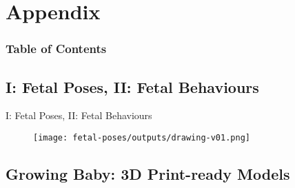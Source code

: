 \section{Appendix}

\begin{frame}
  \frametitle{Table of Contents}
  \tableofcontents[currentsection]
\end{frame}


\subsection{I: Fetal Poses, II: Fetal Behaviours}

{
\begin{frame}{I: Fetal Poses, II: Fetal Behaviours}
      \begin{figure}
        \centering
        \texttt{[image: fetal-poses/outputs/drawing-v01.png]}
      \end{figure}
\end{frame}
}

\subsection{Growing Baby: 3D Print-ready Models}

